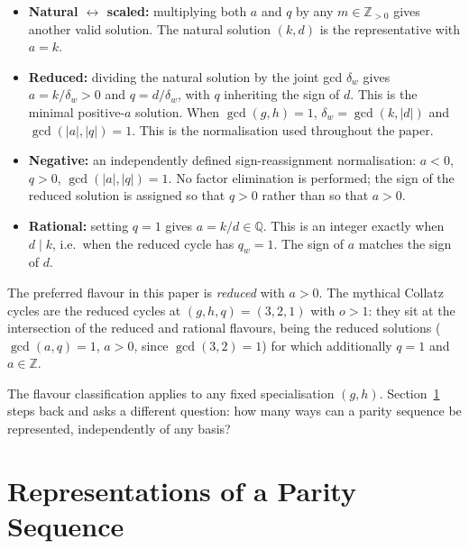 \documentclass[12pt]{article}
\theoremstyle{definition}
\theoremstyle{remark}
\newcommand{\ZZ}{\mathbb{Z}}
\begin{document}
\begin{itemize}
  \item \textbf{Natural $\leftrightarrow$ scaled:} multiplying both $a$
    and $q$ by any $m \in \ZZ_{>0}$ gives another valid solution.  The
    natural solution $(k, d)$ is the representative with $a = k$.

  \item \textbf{Reduced:} dividing the natural solution by the joint gcd
    $\delta_w$ gives $a = k/\delta_w > 0$ and $q = d/\delta_w$, with $q$
    inheriting the sign of $d$.  This is the minimal positive-$a$ solution.
    When $\gcd(g,h)=1$, $\delta_w = \gcd(k,|d|)$ and $\gcd(|a|,|q|)=1$.
    This is the normalisation used throughout the paper.

  \item \textbf{Negative:} an independently defined sign-reassignment
    normalisation: $a < 0$, $q > 0$, $\gcd(|a|,|q|) = 1$.  No factor
    elimination is performed; the sign of the reduced solution is
    assigned so that $q > 0$ rather than so that $a > 0$.

  \item \textbf{Rational:} setting $q = 1$ gives $a = k/d \in \mathbb{Q}$.
    This is an integer exactly when $d \mid k$, i.e.\ when the reduced
    cycle has $q_w = 1$.  The sign of $a$ matches the sign of $d$.
\end{itemize}

The preferred flavour in this paper is \emph{reduced} with $a > 0$.
The mythical Collatz cycles are the reduced cycles at $(g,h,q) = (3,2,1)$
with $o > 1$: they sit at the intersection of the reduced and rational
flavours, being the reduced solutions ($\gcd(a,q)=1$, $a > 0$, since
$\gcd(3,2)=1$) for which additionally $q = 1$ and $a \in \ZZ$.

The flavour classification applies to any fixed specialisation $(g,h)$.
Section~\ref{sec:pvalue} steps back and asks a different question: how many
ways can a parity sequence be represented, independently of any basis?

\section{Representations of a Parity Sequence}
\label{sec:pvalue}
\label{sec:grand-cycle}
\end{document}
